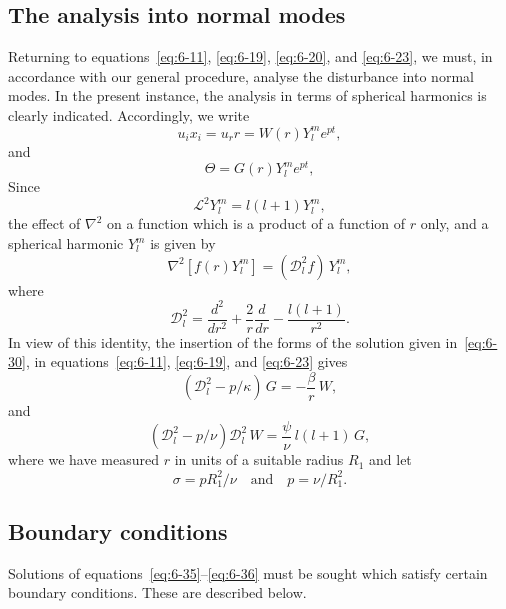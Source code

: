 \subsection{The analysis into normal modes}\label{sec:56b}
Returning to equations~\eqref{eq:6-11}, \eqref{eq:6-19}, \eqref{eq:6-20}, and \eqref{eq:6-23}, we must, in accordance
with our general procedure, analyse the disturbance into normal modes.
In the present instance, the analysis in terms of spherical harmonics is
clearly indicated. Accordingly, we write
\begin{equation}\label{eq:6-30}
u_i x_i = u_r r = W(r) Y_l^m e^{pt},
\end{equation}
and
\begin{equation}\label{eq:6-31}
\Theta = G(r) Y_l^m e^{pt},
\end{equation}
Since
\begin{equation}\label{eq:6-32}
\mathscr{L}^2 Y_l^m = l(l+1) Y_l^m,
\end{equation}
the effect of $\nabla^2$ on a function which is a product of a function of $r$ only,
and a spherical harmonic $Y_l^m$ is given by
\begin{equation}\label{eq:6-33}
\nabla^2[f(r)Y_l^m] = (\mathscr{D}_l^2 f)\,Y_l^m,
\end{equation}
where
\begin{equation}\label{eq:6-34}
\mathscr{D}_l^2 = \frac{d^2}{dr^2} + \frac{2}{r}\frac{d}{dr} - \frac{l(l+1)}{r^2}.
\end{equation}
In view of this identity, the insertion of the forms of the solution given
in~\eqref{eq:6-30}, in equations~\eqref{eq:6-11}, \eqref{eq:6-19}, and \eqref{eq:6-23} gives
\begin{equation}\label{eq:6-35}
(\mathscr{D}_l^2 - p/\kappa)\,G = -\frac{\beta}{r}\,W,
\end{equation}
and
\begin{equation}\label{eq:6-36}
(\mathscr{D}_l^2 - p/\nu)\mathscr{D}_l^2\,W = \frac{\psi}{\nu}\,l(l+1)\,G,
\end{equation}
where we have measured $r$ in units of a suitable radius $R_1$ and let
\begin{equation}\label{eq:6-37}
\sigma = pR_1^2/\nu \quad\text{and}\quad p = \nu/R_1^2.
\end{equation}

\subsection{Boundary conditions}\label{sec:56c}
Solutions of equations~\eqref{eq:6-35}--\eqref{eq:6-36} must be sought which satisfy certain
boundary conditions. These are described below.

